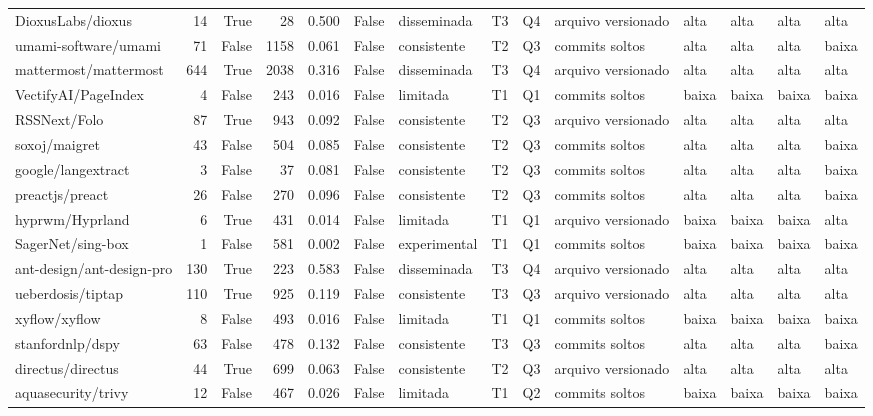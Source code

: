 \begin{tabular}{lrrrrrllllllll}
DioxusLabs/dioxus & 14 & True & 28 & 0.500 & False & disseminada & T3 & Q4 & arquivo versionado & alta & alta & alta & alta \\
umami-software/umami & 71 & False & 1158 & 0.061 & False & consistente & T2 & Q3 & commits soltos & alta & alta & alta & baixa \\
mattermost/mattermost & 644 & True & 2038 & 0.316 & False & disseminada & T3 & Q4 & arquivo versionado & alta & alta & alta & alta \\
VectifyAI/PageIndex & 4 & False & 243 & 0.016 & False & limitada & T1 & Q1 & commits soltos & baixa & baixa & baixa & baixa \\
RSSNext/Folo & 87 & True & 943 & 0.092 & False & consistente & T2 & Q3 & arquivo versionado & alta & alta & alta & alta \\
soxoj/maigret & 43 & False & 504 & 0.085 & False & consistente & T2 & Q3 & commits soltos & alta & alta & alta & baixa \\
google/langextract & 3 & False & 37 & 0.081 & False & consistente & T2 & Q3 & commits soltos & alta & alta & alta & baixa \\
preactjs/preact & 26 & False & 270 & 0.096 & False & consistente & T2 & Q3 & commits soltos & alta & alta & alta & baixa \\
hyprwm/Hyprland & 6 & True & 431 & 0.014 & False & limitada & T1 & Q1 & arquivo versionado & baixa & baixa & baixa & alta \\
SagerNet/sing-box & 1 & False & 581 & 0.002 & False & experimental & T1 & Q1 & commits soltos & baixa & baixa & baixa & baixa \\
ant-design/ant-design-pro & 130 & True & 223 & 0.583 & False & disseminada & T3 & Q4 & arquivo versionado & alta & alta & alta & alta \\
ueberdosis/tiptap & 110 & True & 925 & 0.119 & False & consistente & T3 & Q3 & arquivo versionado & alta & alta & alta & alta \\
xyflow/xyflow & 8 & False & 493 & 0.016 & False & limitada & T1 & Q1 & commits soltos & baixa & baixa & baixa & baixa \\
stanfordnlp/dspy & 63 & False & 478 & 0.132 & False & consistente & T3 & Q3 & commits soltos & alta & alta & alta & baixa \\
directus/directus & 44 & True & 699 & 0.063 & False & consistente & T2 & Q3 & arquivo versionado & alta & alta & alta & alta \\
aquasecurity/trivy & 12 & False & 467 & 0.026 & False & limitada & T1 & Q2 & commits soltos & baixa & baixa & baixa & baixa \\

\end{tabular}
